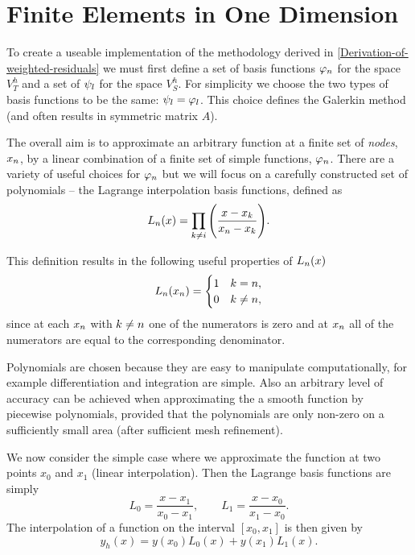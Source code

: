 \section{Finite Elements in One Dimension}
\label{sub:Actual-Finite-Elements}

To create a useable implementation of the methodology derived in \autoref{Derivation-of-weighted-residuals} we must first define a set of basis functions $\varphi_n$ for the space $V_{T}^{h}$ and a set of $\psi_l$ for the space $V_S^h$. For simplicity we choose the two types of basis functions to be the same: $\psi_l = \varphi_l$. This choice defines the Galerkin method (and often results in symmetric matrix $A$).\cite[215]{Zeinkiewicz1967}


The overall aim is to approximate an arbitrary function at a finite set of \emph{nodes}, $x_n$, by a linear combination of a finite set of simple functions, $\varphi_n$. There are a variety of useful choices for $\varphi_n$ but we will focus on a carefully constructed set of polynomials -- the Lagrange interpolation basis functions, defined as
\begin{equation*}
  L_n(x)=\prod_{k\neq i}\Bigg(\dfrac{x-x_{k}}{x_n-x_{k}}\Bigg).
\end{equation*}

This definition results in the following useful properties of $L_{n}(x)$
\begin{equation}
  \label{eq:35}
  L_{n}(x_{n}) =
  \begin{cases}
    1 & k = n, \\
    0 & k \neq n,
  \end{cases}
\end{equation}
since at each $x_{n}$ with $k \neq n$ one of the numerators is zero and at
$x_{n}$ all of the numerators are equal to the corresponding denominator.

Polynomials are chosen because they are easy to manipulate computationally, for example differentiation and integration are simple. Also an arbitrary level of accuracy can be achieved when approximating the a smooth function by piecewise polynomials, provided that the polynomials are only non-zero on a sufficiently small area (\ie after sufficient mesh refinement).

We now consider the simple case where we approximate the function at two points
$x_{0}$ and $x_{1}$ (linear interpolation). Then the Lagrange basis
functions are simply
\begin{equation}
  L_{0}=\dfrac{x-x_{1}}{x_{0}-x_{1}},\qquad
  L_{1}=\dfrac{x-x_{0}}{x_{1}-x_{0}}.
  \label{eq:simple_lagrange}
\end{equation}
The interpolation of a function on the interval $[x_{0},x_{1}]$ is then given by
\begin{equation*}
  y_{h}(x)=y(x_{0})L_{0}(x)+y(x_{1})L_{1}(x).
\end{equation*}

